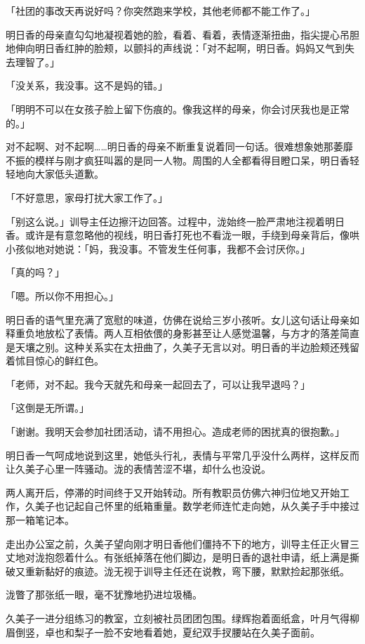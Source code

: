 \documentclass[UTF8]{ctexart}
\begin{document}
    「社团的事改天再说好吗？你突然跑来学校，其他老师都不能工作了。」 

    明日香的母亲直勾勾地凝视着她的脸，看着、看着，表情逐渐扭曲，指尖提心吊胆地伸向明日香红肿的脸颊，以颤抖的声线说：「对不起啊，明日香。妈妈又气到失去理智了。」 

    「没关系，我没事。这不是妈的错。」 

    「明明不可以在女孩子脸上留下伤痕的。像我这样的母亲，你会讨厌我也是正常的。」 

    对不起啊、对不起啊……明日香的母亲不断重复说着同一句话。很难想象她那萎靡不振的模样与刚才疯狂叫嚣的是同一人物。周围的人全都看得目瞪口呆，明日香轻轻地向大家低头道歉。 

    「不好意思，家母打扰大家工作了。」 

    「别这么说。」训导主任边擦汗边回答。过程中，泷始终一脸严肃地注视着明日香。或许是有意忽略他的视线，明日香打死也不看泷一眼，手绕到母亲背后，像哄小孩似地对她说：「妈，我没事。不管发生任何事，我都不会讨厌你。」 

    「真的吗？」 

    「嗯。所以你不用担心。」 

    明日香的语气里充满了宽慰的味道，仿佛在说给三岁小孩听。女儿这句话让母亲如释重负地放松了表情。两人互相依偎的身影甚至让人感觉温馨，与方才的落差简直是天壤之别。这种关系实在太扭曲了，久美子无言以对。明日香的半边脸颊还残留着怵目惊心的鲜红色。 

    「老师，对不起。我今天就先和母亲一起回去了，可以让我早退吗？」 

    「这倒是无所谓。」 

    「谢谢。我明天会参加社团活动，请不用担心。造成老师的困扰真的很抱歉。」 

    明日香一气呵成地说到这里，她低头行礼，表情与平常几乎没什么两样，这样反而让久美子心里一阵骚动。泷的表情苦涩不堪，却什么也没说。 

    两人离开后，停滞的时间终于又开始转动。所有教职员仿佛六神归位地又开始工作，久美子也记起自己怀里的纸箱重量。数学老师连忙走向她，从久美子手中接过那一箱笔记本。 

    走出办公室之前，久美子望向刚才明日香他们僵持不下的地方，训导主任正火冒三丈地对泷抱怨着什么。有张纸掉落在他们脚边，是明日香的退社申请，纸上满是撕破又重新黏好的痕迹。泷无视于训导主任还在说教，弯下腰，默默捡起那张纸。 

    泷瞥了那张纸一眼，毫不犹豫地扔进垃圾桶。 

    久美子一进分组练习的教室，立刻被社员团团包围。绿辉抱着面纸盒，叶月气得柳眉倒竖，卓也和梨子一脸不安地看着她，夏纪双手扠腰站在久美子面前。 
\end{document}
